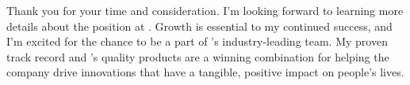 



Thank you for your time and consideration. I'm looking forward to learning more details about the \position\;position at \company. Growth is essential to my continued success, and I'm excited for the chance to be a part of \company's industry-leading team. My proven track record and \company's quality products are a winning combination for helping the company drive innovations that have a tangible, positive impact on people's lives.

